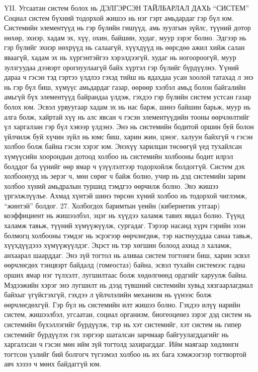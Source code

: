 YII. Угсаатан систем болох нь
ДЭЛГЭРСЭН ТАЙЛБАРЛАЛ ДАХЬ “СИСТЕМ”
Социал систем бүхний тодорхой жишээ нь нэг гэрт амьдардаг гэр бүл юм. Системийн элементүүд нь гэр бүлийн гишүүд, амь зуулгын зүйлс, түүний дотор нөхөр, эхнэр, хадам эх, хүү, охин, байшин, худаг, муур зэрэг болно. Эдгээр нь гэр бүлийг эхнэр нөхрүүд нь салаагүй, хүүхдүүд нь өөрсдөө ажил хийж салан яваагүй, хадам эх нь хүргэнтэйгээ хэрэлдээгүй, худаг нь ногоороогүй, муур зулзгуудаа дээвэрт орогнуулаагүй байх хүртэл гэр бүлийг бүрдүүлнэ. Үүний дараа ч гэсэн тэд гэртээ үлдлээ гэхэд тийш нь ядахдаа усан хоолой татахад л энэ нь гэр бүл биш, хүмүүс амьдардаг газар, өөрөөр хэлбэл амьд болон байгалийн амьгүй бүх элементүүд байрандаа үлдэж, гэхдээ гэр бүлийн систем устсан газар болох юм. Эсвэл урвуугаар хадам эх нь нас барж, шинэ байшин барьж, муур нь алга болж, хайртай хүү нь алс явсан ч гэсэн элементүүдийн тооны өөрчлөлтийг үл харгалзан гэр бүл хэвээр үлдэнэ. Энэ нь системийн бодитой оршин буй болон үйлчилж буй хүчин зүйл нь юмс биш, харин жин, цэнэг, халуун байхгүй ч гэсэн холбоо болж байна гэсэн хэрэг юм. Энэхүү харилцан төсөөгүй үед тухайлсан хүмүүсийн хоорондын дотоод холбоо нь системийн холбооны бодит илрэл болддог ба үүнийг өөр ямар ч үзүүлэлтээр тодорхойлж болдоггүй.
Систем дэх холбоонууд нь эерэг ч, мөн сөрөг ч байж болно, учир нь дэд системийн зарим холбоо хүний амьдралын туршид тэмдгээ өөрчилж болно. Энэ жишээ үргэлжлүүлье. Ахмад хүнтэй шинэ төрсөн хүний холбоо нь тодорхой чиглэмж, “жинтэй” болдог. 27. Холбогдох баримтын үеийн (кибернетик утгаар) коэффициент нь жишээлбэл, эцэг нь хүүдээ халамж тавих явдал болно.
Түүнд халамж тавьж, түүний хүмүүжүүлж, сургадаг. Тэрээр насанд хүрч гэрийн эзэн болмогц холбооны тэмдэг нь эсрэгээр өөрчлөгдөж, тэр настнууддаа санаа тавьж, хүүхдүүдэээ хүмүүжүүлдэг. Эцэст нь тэр хөгшин болоод ахиад л халамж, анхаарал шаарддаг. Энэ зүй тогтол нь аливаа систем тогтонги биш, харин эсвэл өөрчлөгдөх тэнцвэрт байдалд (гомеостаз) байна, эсвэл тухайн системээс гадна орших ямар нэг түлхэлт, лугшилтаас болж хөдөлгөөнд ордгийг харуулж байна. Мэдээжийн хэрэг энэ лугшилт нь дээд түвшний системийн хувьд хязгаарлагдмал байхыг үгүйсгэхгүй, гэхдээ л үйлчлэлийн механизм нь үүнээс болж өөрчлөгдөхгүй.
Гэр бүл нь системийн илт жишээ болно. Гэхдээ илүү нарийн систем, жишээлбэл, угсаатан, социал организм, биогеоценез зэрэг дэд систем нь системийн бүхэллэгийг бүрдүүлж, тэр нь хэт системийг, хэт систем нь гипер системийг бүрдүүлэх гэх зэргээр шаталсан зарчмаар байгуулагддагийг нь харгалзсан ч гэсэн мөн ийм зүй тогтолд захирагддаг.
Ийм маягаар хөдлөнги тогтсон үзлийг бий болгогч түгээмэл холбоо нь их бага хэмжээгээр тогтвортой авч хэзээ ч мөнх байдаггүй юм.
